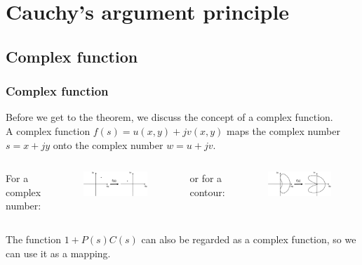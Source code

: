 \section{Cauchy's argument principle}

\subsection{Complex function}

\begin{frame}
	\frametitle{Complex function}
	Before we get to the theorem, we discuss the concept of a complex function.\\
	\medskip
	A complex function $f(s)=u(x,y)+\mathit{j}v(x,y)$ maps the complex number $s=x+\mathit{j}y$ onto the complex number $w=u+\mathit{j}v$.
	\begin{columns}
		\begin{center}
			For a complex number:
		\end{center}
		\begin{figure}
			\includegraphics[width=1.0\linewidth]{complex1}
		\end{figure}
		\begin{center}
			or for a contour:
		\end{center}
		\begin{figure}
			\includegraphics[width=1.0\linewidth]{complex2}
		\end{figure}
	\end{columns}
	\medskip
	The function $1+P(s)C(s)$ can also be regarded as a complex function, so we can use it as a mapping.
\end{frame}

